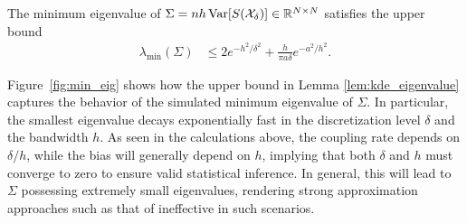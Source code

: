\begin{lemma}%
  \label{lem:kde_eigenvalue}
  The minimum eigenvalue of
  $\Sigma=n h\operatorname{Var}[S(\mathcal{X}_\delta)] \in \mathbb{R}^{N \times N}$
  satisfies the upper bound
  \begin{align*}
    \lambda_{\min}(\Sigma)
    &\leq
    2 e^{-h^2/\delta^2}
    + \frac{h}{\pi a \delta}
    e^{-a^2 / h^2}.
  \end{align*}
\end{lemma}
%
Figure~\ref{fig:min_eig} shows how the upper bound in Lemma
\ref{lem:kde_eigenvalue} captures the behavior of the simulated minimum
eigenvalue of $\Sigma$. In particular, the smallest eigenvalue decays
exponentially fast in the discretization level $\delta$ and the bandwidth $h$.
As seen in the calculations above, the coupling rate depends on $\delta / h$,
while the bias will generally depend on $h$, implying that both $\delta$ and
$h$ must converge to zero to ensure valid statistical inference. In general,
this will lead to $\Sigma$ possessing extremely small eigenvalues, rendering
strong approximation approaches such as that of \citet{li2020uniform}
ineffective in such scenarios.
%

